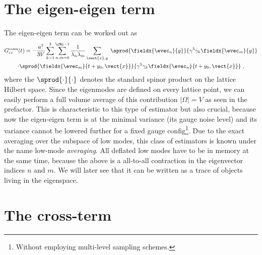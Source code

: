 \section{The eigen-eigen term}
\label{sec:lma:ee}

The eigen-eigen term can be worked out as
\begin{multline} \label{eq:Gconn:eigen-eigen}
G_{ee}^{\text{conn}}(t)
= - \frac{a^{3}}{3 V}
\sum_{k=1}^{3}
\sum_{n,m=0}^{\cNc-1} \frac{1}{\lambda_{n} \lambda_{m}}
\sum_{\vect{x},y} \;
\sprod{
  \fieldx{\evec_{n}}{y}
}{
  \gamma^{5}
  \gamma_k
  \fieldx{\evec_{m}}{y}
} \\
\cdot
\sprod{
  \fieldx{\evec_{m}}{t+y_0, \vect{x}}
}{
  \gamma^{5}
  \gamma_k
  \fieldx{\evec_{n}}{t+y_0, \vect{x}}
} \;,
\end{multline}
where the $\sprod{\cdot}{\cdot}$ denotes the standard spinor product on the lattice Hilbert space.
Since the eigenmodes are defined on every lattice point, we can easily perform a full volume average of this contribution $\lvert \Omega \rvert = V$ as seen in the prefactor.
This is characteristic to this type of estimator but also crucial, because now the eigen-eigen term is at the minimal variance (its gauge noise level) and its variance cannot be lowered further for a fixed gauge config\footnote{Without employing multi-level sampling schemes.}.
Due to the exact averaging over the subspace of low modes, this class of estimators is known under the name low-mode \emph{averaging}.
All deflated low modes have to be in memory at the same time, because the above is a all-to-all contraction in the eigenvector indices $n$ and $m$.
We will later see that it can be written as a trace of objects living in the eigenspace.

\section{The cross-term}
\label{sec:lma:x}

